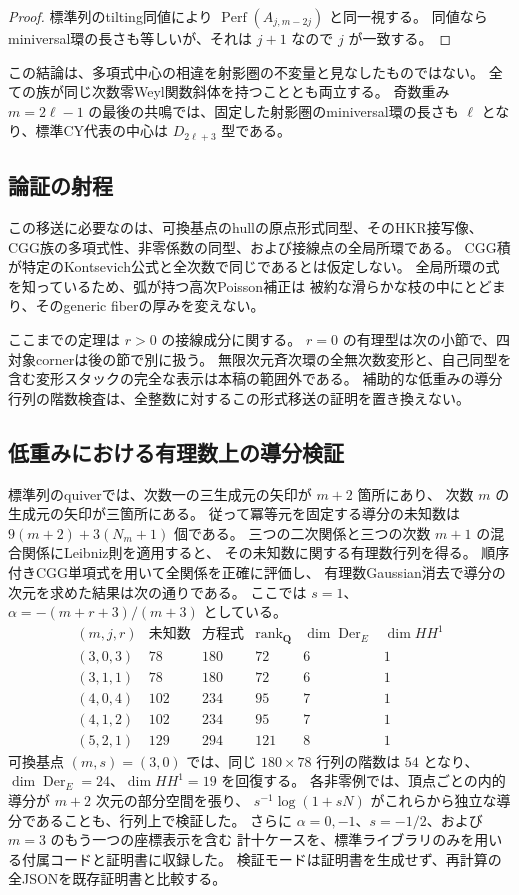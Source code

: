 \begin{proof}
標準列のtilting同値により $\operatorname{Perf}(A_{j,m-2j})$ と同一視する。
同値ならminiversal環の長さも等しいが、それは $j+1$ なので $j$ が一致する。
\end{proof}

この結論は、多項式中心の相違を射影圏の不変量と見なしたものではない。
全ての族が同じ次数零Weyl関数斜体を持つこととも両立する。
奇数重み $m=2\ell-1$ の最後の共鳴では、固定した射影圏のminiversal環の長さも
$\ell$ となり、標準CY代表の中心は $D_{2\ell+3}$ 型である。

\subsection{論証の射程}

この移送に必要なのは、可換基点のhullの原点形式同型、そのHKR接写像、
CGG族の多項式性、非零係数の同型、および接線点の全局所環である。
CGG積が特定のKontsevich公式と全次数で同じであるとは仮定しない。
全局所環の式を知っているため、弧が持つ高次Poisson補正は
被約な滑らかな枝の中にとどまり、そのgeneric fiberの厚みを変えない。

ここまでの定理は $r>0$ の接線成分に関する。
$r=0$ の有理型は次の小節で、四対象cornerは後の節で別に扱う。
無限次元斉次環の全無次数変形と、自己同型を含む変形スタックの完全な表示は本稿の範囲外である。
補助的な低重みの導分行列の階数検査は、全整数に対するこの形式移送の証明を置き換えない。

\subsection{低重みにおける有理数上の導分検証}

標準列のquiverでは、次数一の三生成元の矢印が $m+2$ 箇所にあり、
次数 $m$ の生成元の矢印が三箇所にある。
従って冪等元を固定する導分の未知数は
$9(m+2)+3(N_m+1)$ 個である。
三つの二次関係と三つの次数 $m+1$ の混合関係にLeibniz則を適用すると、
その未知数に関する有理数行列を得る。
順序付きCGG単項式を用いて全関係を正確に評価し、
有理数Gaussian消去で導分の次元を求めた結果は次の通りである。
ここでは $s=1$、$\alpha=-(m+r+3)/(m+3)$ としている。
\[
\begin{array}{c|c|c|c|c|c}
(m,j,r)&\text{未知数}&\text{方程式}&\operatorname{rank}_{\mathbf Q}
 &\dim\operatorname{Der}_E&\dim HH^1\\\hline
(3,0,3)&78&180&72&6&1\\
(3,1,1)&78&180&72&6&1\\
(4,0,4)&102&234&95&7&1\\
(4,1,2)&102&234&95&7&1\\
(5,2,1)&129&294&121&8&1
\end{array}
\]
可換基点 $(m,s)=(3,0)$ では、同じ $180\times78$ 行列の階数は $54$ となり、
$\dim\operatorname{Der}_E=24$、$\dim HH^1=19$ を回復する。
各非零例では、頂点ごとの内的導分が $m+2$ 次元の部分空間を張り、
$s^{-1}\log(1+sN)$ がこれらから独立な導分であることも、行列上で検証した。
さらに $\alpha=0,-1$、$s=-1/2$、および $m=3$ のもう一つの座標表示を含む
計十ケースを、標準ライブラリのみを用いる付属コードと証明書に収録した。
検証モードは証明書を生成せず、再計算の全JSONを既存証明書と比較する。
